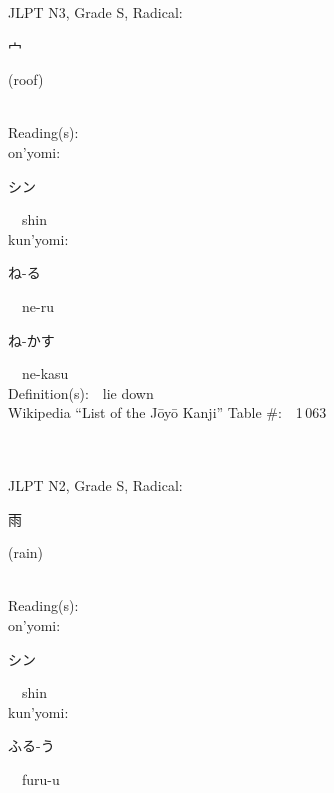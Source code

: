 \begin{multicols}{2}
{JLPT N3, Grade S, Radical:\ \ {\begin{CJK}{UTF8}{min} 宀 \end{CJK}} (roof) } \\
Reading(s):\ \ \\
{\hspace*{1em}}on'yomi:\ \ \\
{\hspace*{2em}}{\begin{CJK}{UTF8}{min} シン \end{CJK}}\ \ shin\ \ \\
{\hspace*{1em}}kun'yomi:\ \ \\
{\hspace*{2em}}{\begin{CJK}{UTF8}{min} ね-る \end{CJK}}\ \ ne-ru\ \ \\
{\hspace*{2em}}{\begin{CJK}{UTF8}{min} ね-かす \end{CJK}}\ \ ne-kasu\ \ \\
Definition(s):\ \ lie down \\
Wikipedia ``List of the J\=oy\=o Kanji'' Table \#:\ \ 1\,063 \\
\ \ \\
{\fontsize{34pt}{40pt}  }\ \ \\  %
{JLPT N2, Grade S, Radical:\ \ {\begin{CJK}{UTF8}{min} 雨 \end{CJK}} (rain) } \\
Reading(s):\ \ \\
{\hspace*{1em}}on'yomi:\ \ \\
{\hspace*{2em}}{\begin{CJK}{UTF8}{min} シン \end{CJK}}\ \ shin\ \ \\
{\hspace*{1em}}kun'yomi:\ \ \\
{\hspace*{2em}}{\begin{CJK}{UTF8}{min} ふる-う \end{CJK}}\ \ furu-u\ \ \\

\end{multicols}

